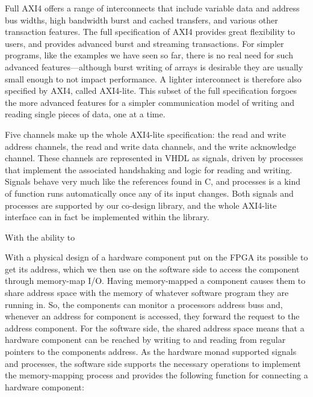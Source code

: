 \documentclass[../main.tex]{subfiles}
\begin{document}
Full AXI4 offers a range of interconnects that include variable data and address bus widths, high bandwidth burst and cached transfers, and various other transaction features. The full specification of AXI4 provides great flexibility to users, and provides advanced burst and streaming transactions. For simpler programs, like the examples we have seen so far, there is no real need for such advanced features---although burst writing of arrays is desirable they are usually small enough to not impact performance. A lighter interconnect is therefore also specified by AXI4, called AXI4-lite. This subset of the full specification forgoes the more advanced features for a simpler communication model of writing and reading single pieces of data, one at a time.

Five channels make up the whole AXI4-lite specification: the read and write address channels, the read and write data channels, and the write acknowledge channel. These channels are represented in VHDL as signals, driven by processes that implement the associated handshaking and logic for reading and writing. Signals behave very much like the references found in C, and processes is a kind of function runs automatically once any of its input changes. Both signals and processes are supported by our co-design library, and the whole AXI4-lite interface can in fact be implemented within the library. %


With the ability to 

With a physical design of a hardware component put on the FPGA its possible to get its address, which we then use on the software side to access the component through memory-map I/O. Having memory-mapped a component causes them to share address space with the memory of whatever software program they are running in. So, the components can monitor a processors address buss and, whenever an address for component is accessed, they forward the request to the address component. For the software side, the shared address space means that a hardware component can be reached by writing to and reading from regular pointers to the components address. As the hardware monad supported signals and processes, the software side supports the necessary operations to implement the memory-mapping process and provides the following function for connecting a hardware component:
\end{document}
